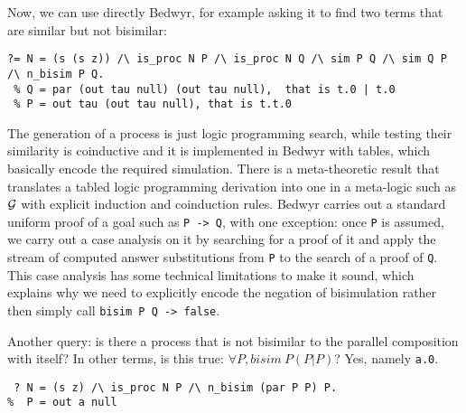 \documentclass[a4paper]{easychair}
\begin{document}
Now, we can use directly Bedwyr, for example asking it to find two
terms that are similar but not bisimilar:
\begin{lstlisting}
?= N = (s (s z)) /\ is_proc N P /\ is_proc N Q /\ sim P Q /\ sim Q P /\ n_bisim P Q.
 % Q = par (out tau null) (out tau null),  that is t.0 | t.0
 % P = out tau (out tau null), that is t.t.0
\end{lstlisting}

The generation of a process is just logic programming search, while
testing their similarity is coinductive and it is implemented in
Bedwyr with tables, which basically encode the required
simulation. There is a meta-theoretic result that translates a tabled
logic programming derivation into one in a meta-logic such as $\cal G$
with explicit induction and coinduction rules.  Bedwyr carries out a
standard uniform proof of a goal such as \verb|P -> Q|, with one
exception: once \texttt{P} is assumed, we carry out a case analysis on
it by searching for a proof of it and apply the stream of computed
answer substitutions from \texttt{P} to the search of a proof of
\texttt{Q}. This case analysis has some technical limitations to make
it sound, which explains why we need to explicitly encode the negation
of bisimulation rather then simply call \verb|bisim P Q -> false|.

\begin{changebar}
  Another query: is there a process that is not bisimilar to the
  parallel composition with itself? In other terms, is this true:
  $\forall P, bisim\ P ( P | P)$? Yes, namely \texttt{a.0}.
\end{changebar}


\begin{lstlisting}
 ? N = (s z) /\ is_proc N P /\ n_bisim (par P P) P.
%  P = out a null
\end{lstlisting}
\end{document}
